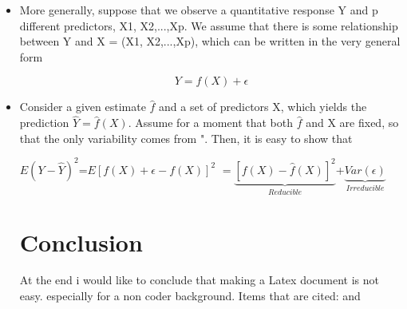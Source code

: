 \documentclass[12pt, letterpaper]{article}
\begin{document}
\begin{itemize}

  \item More generally, suppose that we observe a quantitative response Y and p different predictors, X1, X2,...,Xp. We assume that there is some relationship between Y and X = (X1, X2,...,Xp), which can be written in the very general form
  
  \[Y = f(X)+\epsilon\]

  \item Consider a given estimate $\hat{f}$ and a set of predictors X, 
  which yields the prediction $\hat{Y} = \hat{f}(X)$.  Assume for a moment that both $\hat{f}$ and X are fixed,
  so that the only variability comes from ". Then, it is easy to show that

  $E(Y-\hat{Y})^2$=$E[f(X)+\epsilon-f(X)]^2$
  $=\underbrace{[f(X)-\hat{f}(X)]^2}_{Reducible}$+$\underbrace{Var(\epsilon)}_{Irreducible}$
  
\section{Conclusion}
\label{sec:con}

 At the end i would like to conclude that making a Latex document is not easy. especially for a non coder background.
Items that are cited:\cite{latexcompanion} and \cite{LoveJonathon2019JGss}

\end{itemize}



\end{document}
